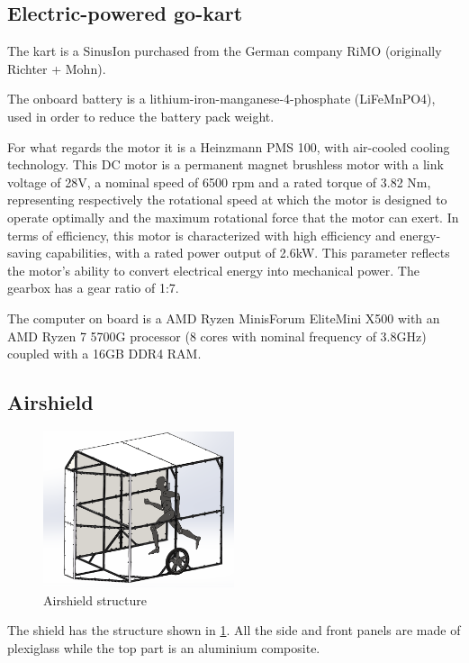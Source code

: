 \documentclass[a4paper,12pt,oneside]{book}
\begin{document}
\subsection*{Electric-powered go-kart}
The kart is a SinusIon purchased from the German company RiMO (originally Richter + Mohn). 

\bigskip
The onboard battery is a lithium-iron-manganese-4-phosphate (LiFeMnPO4), used in order to reduce the battery pack weight.

\bigskip
For what regards the motor it is a Heinzmann PMS 100, with air-cooled cooling technology. 
This DC motor is a permanent magnet brushless motor with a link voltage of 28V, a nominal speed of 6500 rpm and a rated torque of 3.82 Nm, representing respectively the rotational speed at which the motor is designed to operate optimally and the maximum rotational force that the motor can exert.
In terms of efficiency, this motor is characterized with high efficiency and energy-saving capabilities, with a rated power output of 2.6kW. 
This parameter reflects the motor's ability to convert electrical energy into mechanical power.
The gearbox has a gear ratio of 1:7.

\bigskip
The computer on board is a AMD Ryzen MinisForum EliteMini X500 with an AMD Ryzen 7 5700G processor (8 cores with nominal frequency of 3.8GHz) coupled with a 16GB DDR4 RAM.

\subsection*{Airshield}

\begin{figure}
	\centering
	\includegraphics[width=0.5\textwidth]{Shield_structure.png}
\caption{Airshield structure}
\label{Shield_structure}
\end{figure}

The shield has the structure shown in \ref{Shield_structure}.
All the side and front panels are made of plexiglass while the top part is an aluminium composite.
\end{document}
